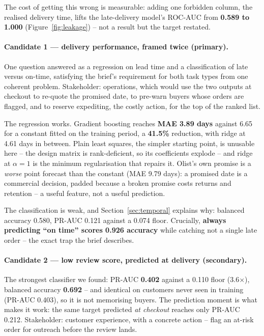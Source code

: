 The cost of getting this wrong is measurable: adding one forbidden column, the
realised delivery time, lifts the late-delivery model's ROC-AUC from \textbf{0.589
to 1.000} (Figure~\ref{fig:leakage}) -- not a result but the target restated.

\paragraph{Candidate 1 --- delivery performance, framed twice (primary).}
One question answered as a regression on lead time and a classification of late
versus on-time, satisfying the brief's requirement for both task types from one
coherent problem. Stakeholder: operations, which would use the two outputs at
checkout to re-quote the promised date, to pre-warn buyers whose orders are
flagged, and to reserve expediting, the costly action, for the top of the
ranked list.

The regression works. Gradient boosting reaches \textbf{MAE 3.89 days} against
6.65 for a constant fitted on the training period, a \textbf{41.5\%} reduction,
with ridge at 4.61 days in between. Plain least squares, the simpler starting
point, is unusable here -- the design matrix is rank-deficient, so its
coefficients explode -- and ridge at $\alpha = 1$ is the minimum regularisation
that repairs it. Olist's own promise is a \emph{worse} point forecast than the
constant (MAE 9.79 days): a promised date is a commercial decision, padded
because a broken promise costs returns and retention \citep{cui2024promise} --
a useful feature, not a useful prediction.

The classification is weak, and Section~\ref{sec:temporal} explains why: balanced
accuracy 0.580, PR-AUC 0.121 against a 0.074 floor. Crucially, \textbf{always
predicting ``on time'' scores 0.926 accuracy} while catching not a single late
order -- the exact trap the brief describes.

\paragraph{Candidate 2 --- low review score, predicted at delivery (secondary).}
The strongest classifier we found: PR-AUC \textbf{0.402} against a 0.110 floor
(3.6$\times$), balanced accuracy \textbf{0.692} -- and identical on customers never
seen in training (PR-AUC 0.403), so it is not memorising buyers. The prediction
moment is what makes it work: the same target predicted \emph{at checkout} reaches
only PR-AUC 0.212. Stakeholder: customer experience, with a concrete action --
flag an at-risk order for outreach before the review lands.

